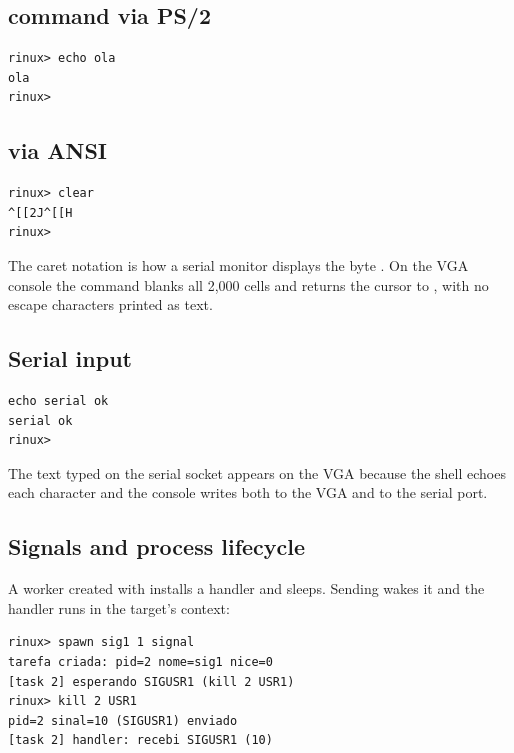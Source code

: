 \subsection{ command via PS/2}

\begin{lstlisting}[style=shell,caption={Output of \code{echo ola} after PS/2 input.},label={lst:testecho}]
rinux> echo ola
ola
rinux>
\end{lstlisting}

\subsection{ via ANSI}

\begin{lstlisting}[style=shell,caption={Escape sequence observed on COM1.},label={lst:testclear}]
rinux> clear
^[[2J^[[H
rinux>
\end{lstlisting}

The caret notation is how a serial monitor displays the byte . On
the VGA console the command blanks all 2,000 cells and returns the cursor to
, with no escape characters printed as text.

\subsection{Serial input}

\begin{lstlisting}[style=shell,caption={Input and output through COM1.},label={lst:testserial}]
echo serial ok
serial ok
rinux>
\end{lstlisting}

The text typed on the serial socket appears on the VGA because the shell echoes
each character and the console writes both to the VGA and to the serial port.

\subsection{Signals and process lifecycle}

A worker created with  installs a 
handler and sleeps. Sending  wakes it and the handler runs
in the target's context:

\begin{lstlisting}[style=shell,caption={Custom signal handler.},label={lst:testsignal}]
rinux> spawn sig1 1 signal
tarefa criada: pid=2 nome=sig1 nice=0
[task 2] esperando SIGUSR1 (kill 2 USR1)
rinux> kill 2 USR1
pid=2 sinal=10 (SIGUSR1) enviado
[task 2] handler: recebi SIGUSR1 (10)
\end{lstlisting}

